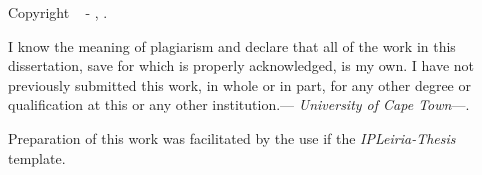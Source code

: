 
\vspace*{\fill}

\noindent \textbf{\GetTitle}

\noindent Copyright \textcopyright~\the\year{} - \GetAuthor, \GetFaculty.

\vspace{.575em}

\noindent I know the meaning of plagiarism and declare that all of the work in this dissertation, save for which is properly acknowledged, is my own. I have not previously submitted this work, in whole or in part, for any other degree or qualification at this or any other institution.---
\textit{University of Cape Town}---.

\vspace{1.395em}

\noindent{}

\vspace{.935em}

\noindent Preparation of this work was facilitated by the use if the \textit{IPLeiria-Thesis} template.

\vspace*{\fill}
\MediaOptionLogic